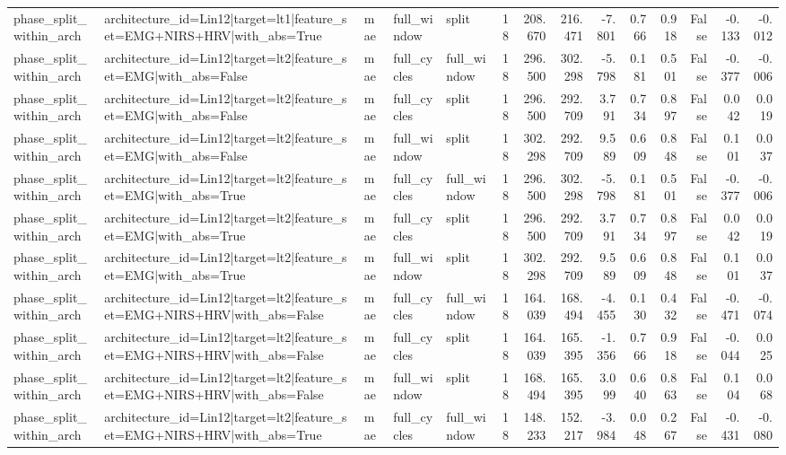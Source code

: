 \begin{table}
\begin{tabular}{lllllrrrrrrrrr}
phase_split_within_arch & architecture_id=Lin12|target=lt1|feature_set=EMG+NIRS+HRV|with_abs=True & mae & full_window & split & 18 & 208.670 & 216.471 & -7.801 & 0.766 & 0.918 & False & -0.133 & -0.012 \\
phase_split_within_arch & architecture_id=Lin12|target=lt2|feature_set=EMG|with_abs=False & mae & full_cycles & full_window & 18 & 296.500 & 302.298 & -5.798 & 0.181 & 0.501 & False & -0.377 & -0.006 \\
phase_split_within_arch & architecture_id=Lin12|target=lt2|feature_set=EMG|with_abs=False & mae & full_cycles & split & 18 & 296.500 & 292.709 & 3.791 & 0.734 & 0.897 & False & 0.042 & 0.019 \\
phase_split_within_arch & architecture_id=Lin12|target=lt2|feature_set=EMG|with_abs=False & mae & full_window & split & 18 & 302.298 & 292.709 & 9.589 & 0.609 & 0.848 & False & 0.101 & 0.037 \\
phase_split_within_arch & architecture_id=Lin12|target=lt2|feature_set=EMG|with_abs=True & mae & full_cycles & full_window & 18 & 296.500 & 302.298 & -5.798 & 0.181 & 0.501 & False & -0.377 & -0.006 \\
phase_split_within_arch & architecture_id=Lin12|target=lt2|feature_set=EMG|with_abs=True & mae & full_cycles & split & 18 & 296.500 & 292.709 & 3.791 & 0.734 & 0.897 & False & 0.042 & 0.019 \\
phase_split_within_arch & architecture_id=Lin12|target=lt2|feature_set=EMG|with_abs=True & mae & full_window & split & 18 & 302.298 & 292.709 & 9.589 & 0.609 & 0.848 & False & 0.101 & 0.037 \\
phase_split_within_arch & architecture_id=Lin12|target=lt2|feature_set=EMG+NIRS+HRV|with_abs=False & mae & full_cycles & full_window & 18 & 164.039 & 168.494 & -4.455 & 0.130 & 0.432 & False & -0.471 & -0.074 \\
phase_split_within_arch & architecture_id=Lin12|target=lt2|feature_set=EMG+NIRS+HRV|with_abs=False & mae & full_cycles & split & 18 & 164.039 & 165.395 & -1.356 & 0.766 & 0.918 & False & -0.044 & 0.025 \\
phase_split_within_arch & architecture_id=Lin12|target=lt2|feature_set=EMG+NIRS+HRV|with_abs=False & mae & full_window & split & 18 & 168.494 & 165.395 & 3.099 & 0.640 & 0.863 & False & 0.104 & 0.068 \\
phase_split_within_arch & architecture_id=Lin12|target=lt2|feature_set=EMG+NIRS+HRV|with_abs=True & mae & full_cycles & full_window & 18 & 148.233 & 152.217 & -3.984 & 0.048 & 0.267 & False & -0.431 & -0.080 \\

\end{tabular}
\end{table}
